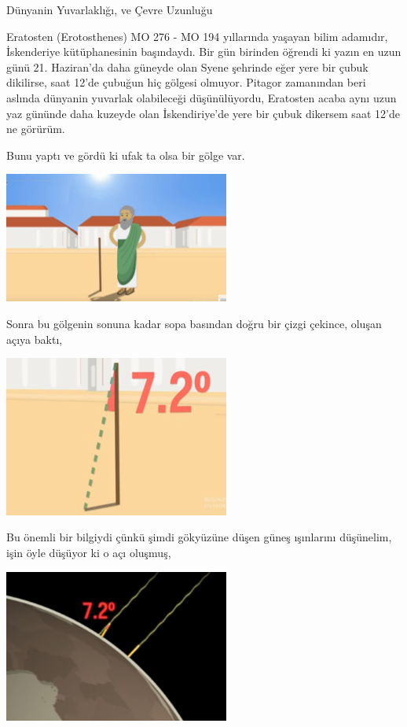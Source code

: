 \documentclass[12pt,fleqn]{article}\usepackage{../../common}
\begin{document}
Dünyanin Yuvarlaklığı, ve Çevre Uzunluğu

Eratosten (Erotosthenes) MO 276 - MO 194 yıllarında yaşayan bilim adamıdır,
İskenderiye kütüphanesinin başındaydı. Bir gün birinden öğrendi ki yazın en uzun
günü 21. Haziran'da daha güneyde olan Syene şehrinde eğer yere bir çubuk
dikilirse, saat 12'de çubuğun hiç gölgesi olmuyor. Pitagor zamanından beri
aslında dünyanin yuvarlak olabileceği düşünülüyordu, Eratosten acaba aynı uzun
yaz gününde daha kuzeyde olan İskendiriye'de yere bir çubuk dikersem saat 12'de
ne görürüm.

Bunu yaptı ve gördü ki ufak ta olsa bir gölge var. 

\includegraphics[width=20em]{circum3.jpg}

Sonra bu gölgenin sonuna kadar sopa basından doğru bir çizgi çekince, oluşan
açıya baktı,

\includegraphics[width=20em]{circum4.jpg}

Bu önemli bir bilgiydi çünkü şimdi gökyüzüne düşen güneş ışınlarını düşünelim,
işin öyle düşüyor ki o açı oluşmuş, 

\includegraphics[width=20em]{circum1.jpg}
\end{document}
